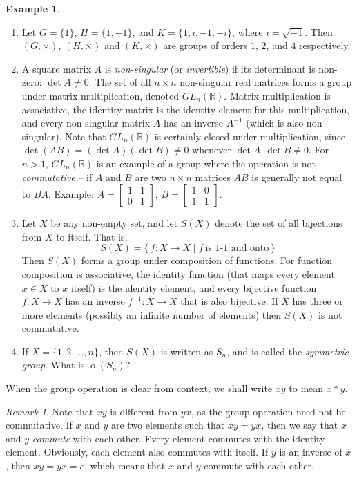 \documentclass[svgnames]{article}
\theoremstyle{definition}
\newtheorem{Example}[Theorem]{Example}
\theoremstyle{remark}
\newtheorem*{Remark*}{Remark}
\DeclareMathOperator{\ord}{o}
\begin{document}
\begin{Example}
\begin{enumerate}
\item Let $G = \{1\}$, $H = \{1, -1\}$, and $K = \{1, i, -1, -i\}$, where $i = \sqrt{-1}$. Then $(G, \times)$, $(H, \times)$ and $(K, \times)$ are groups of orders $1$, $2$, and $4$ respectively.
\item A square matrix $A$ is \emph{non-singular} (or \emph{invertible}) if its determinant is non-zero: $\det A \ne 0$. The set of all $n \times n$ non-singular real matrices forms a group under matrix multiplication, denoted $GL_n(\mathbb R)$. Matrix multiplication is associative, the identity matrix is the identity element for this multiplication, and every non-singular matrix $A$ has an inverse $A^{-1}$ (which is also non-singular). Note that $GL_n(\mathbb R)$ is certainly closed under multiplication, since $\det(AB) = (\det A)(\det B) \ne 0$ whenever $\det A, \det B \ne 0$. For $n > 1$, $GL_n(\mathbb R)$ is an example of a group where the operation is not \emph{commutative} -- if $A$ and $B$ are two $n \times n$ matrices $AB$ is generally not equal to $BA$. Example: $A = \begin{bmatrix} 1 & 1\\ 0 & 1\end{bmatrix}$, $B = \begin{bmatrix}1 & 0\\ 1 & 1\end{bmatrix}$.
\item Let $X$ be any non-empty set, and let $S(X)$ denote the set of all bijections from $X$ to itself. That is,
\begin{equation*}
S(X) = \{\, f\colon X \to X \mid f\ \text{is $1$-$1$ and onto} \,\}
\end{equation*}
Then $S(X)$ forms a group under composition of functions. For function composition is associative, the identity function (that maps every element $x \in X$ to $x$ itself) is the identity element, and every bijective function $f \colon X \to X$ has an inverse $f^{-1} \colon X \to X$ that is also bijective. If $X$ has three or more elements (possibly an infinite number of elements) then $S(X)$ is not commutative.
\item\label{it:Sn} If $X = \{1, 2, \ldots, n\}$, then $S(X)$ is written as $S_n$, and is called the \emph{symmetric group}. What is $\ord(S_n)$?
\end{enumerate}
\end{Example}
When the group operation is clear from context, we shall write $xy$ to mean $x * y$.

\begin{Remark*}
Note that $xy$ is different from $yx$, as the group operation need not be commutative. If $x$ and $y$ are two elements such that $xy = yx$, then we say that $x$ and $y$ \emph{commute} with each other. Every element commutes with the identity element. Obviously, each element also commutes with itself. If $y$ is an inverse of $x$, then $xy = yx = e$, which means that $x$ and $y$ commute with each other.
\end{Remark*}
\end{document}
